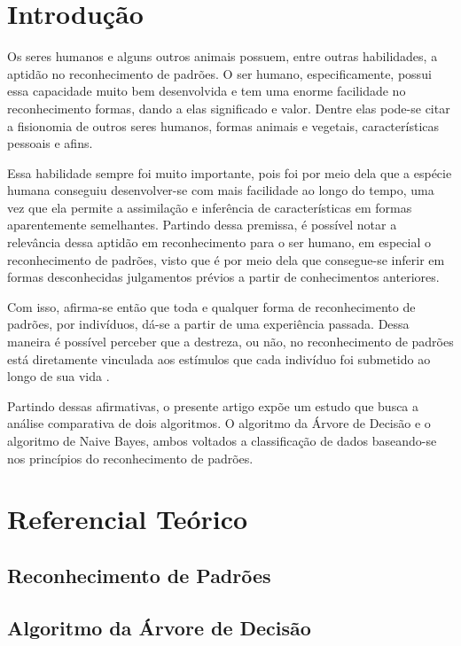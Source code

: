 \documentclass[preprint,12pt,times]{elsarticle}
\begin{document}
	\linenumbers

	\section{Introdução}
	\label{Introdução}
	Os seres humanos e alguns outros animais possuem, entre outras habilidades, a aptidão no reconhecimento de padrões. O ser humano, especificamente, possui essa capacidade muito bem desenvolvida e tem uma enorme facilidade no reconhecimento formas, dando a elas significado e valor. Dentre elas pode-se citar a fisionomia de outros seres humanos, formas animais e vegetais, características pessoais e afins.

	Essa habilidade sempre foi muito importante, pois foi por meio dela que a espécie humana conseguiu desenvolver-se com mais facilidade ao longo do tempo, uma vez que ela permite a assimilação e inferência de características em formas aparentemente semelhantes. Partindo dessa premissa, é possível notar a relevância dessa aptidão em reconhecimento para o ser humano, em especial o reconhecimento de padrões, visto que é por meio dela que consegue-se inferir em formas desconhecidas julgamentos prévios a partir de conhecimentos anteriores.

	Com isso, afirma-se então que toda e qualquer forma de reconhecimento de padrões, por indivíduos, dá-se a partir de uma experiência passada. Dessa maneira é possível perceber que a destreza, ou não, no reconhecimento de padrões está diretamente vinculada aos estímulos que cada indivíduo foi submetido ao longo de sua vida \cite{Prado:2008}.

	Partindo dessas afirmativas, o presente artigo expõe um estudo que busca a análise comparativa de dois algoritmos. O algoritmo da Árvore de Decisão e o algoritmo de Naive Bayes, ambos voltados a classificação de dados baseando-se nos princípios do reconhecimento de padrões.

	\section{Referencial Teórico}
	\label{Referencial Teórico}

	\subsection{Reconhecimento de Padrões}

	\subsection{Algoritmo da Árvore de Decisão}
\end{document}
